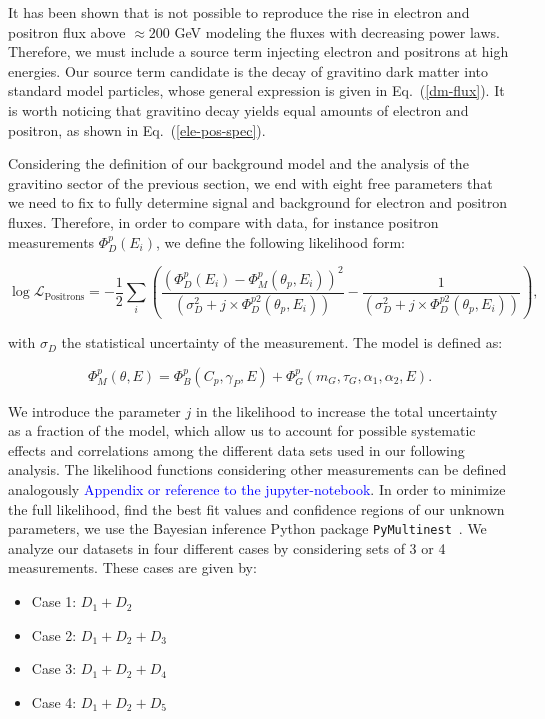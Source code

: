 \documentclass[a4paper,11pt]{article}
\newcommand*{\blue}{\textcolor{blue}}
\begin{document}
It has been shown that is not possible to reproduce the rise in electron and positron flux above $\approx 200$ GeV modeling the fluxes with decreasing power laws. Therefore, we must include a source term injecting electron and positrons at high energies. Our source term candidate is the decay of gravitino dark matter into standard model particles, whose general expression is given in Eq.~(\ref{dm-flux}). It is worth noticing that gravitino decay yields equal amounts of electron and positron, as shown in Eq.~(\ref{ele-pos-spec}). 

Considering the definition of our background model and the analysis of the gravitino sector of the previous section, we end with eight free parameters that we need to fix to fully determine signal and background for electron and positron fluxes. Therefore, in order to compare with data, for instance positron measurements $\Phi_D^p(E_i)$, we define the following likelihood form:

\begin{equation}
\log  \mathcal{L}_{\text{Positrons}} = -\frac{1}{2} \sum_i{\left( \frac{(\Phi_D^p(E_i) - \Phi_M^p(\theta_p,E_i ))^2}{(\sigma_D^2 + j\times \Phi_D^{p2}(\theta_p,E_i))} - \frac{1}{(\sigma_D^2 + j\times \Phi_D^{p2}(\theta_p,E_i))}  \right) },
\end{equation}

\noindent with $\sigma_D$ the statistical uncertainty of the measurement. The model is defined as:

\begin{equation}
\Phi_M^p(\theta,E ) = \Phi_B^p(C_p, \gamma_P, E) + \Phi_{G}^{p}(m_G, \tau_G, \alpha_1, \alpha_2, E).
\end{equation}

We introduce the parameter $j$ in the likelihood to increase the total uncertainty as a fraction of the model, which allow us to account for possible systematic effects and correlations among the different data sets used in our following analysis. The likelihood functions considering other measurements can be defined analogously \blue{Appendix or reference to the jupyter-notebook}. In order to minimize the full likelihood, find the best fit values and confidence regions of our unknown parameters, we use the Bayesian inference Python package \verb|PyMultinest|~\cite{Buchner:2014nha}. We analyze our datasets in four different cases by considering sets of 3 or 4 measurements. These cases are given by:

\begin{itemize}
\item Case 1: $D_1 + D_2$
\item Case 2: $D_1 + D_2 + D_3$
\item Case 3: $D_1 + D_2 + D_4$
\item Case 4: $D_1 + D_2 + D_5$
\end{itemize}
\end{document}
